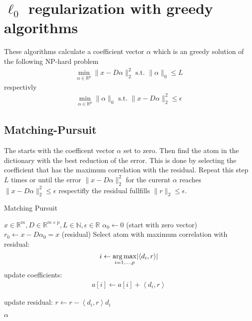 \section{$\ell_0$ regularization with greedy algorithms}

These algorithms calculate a coefficient vector $\alpha$ which is an greedy solution of the following NP-hard problem
\begin{align}
\min_{\alpha\in\mathbb{R}^{p}}  \lVert x - D\alpha \rVert^{2}_{2} \textrm{ s.t. } \lVert \alpha \rVert_{0} \leq L
\end{align}
respectivly
\begin{align}
\min_{\alpha\in\mathbb{R}^{p}}   \lVert \alpha \rVert_{0}   \textrm{ s.t. } \lVert x - D\alpha \rVert^{2}_{2} \leq \epsilon
\end{align}
\cite{Mallat1993}

\subsection{Matching-Pursuit}
\label{sec:mp}

The  starts with the coefficent vector $\alpha$ set to zero. Then find the atom in the dictionary with the best reduction of the error.
This is done by selecting the coefficient that has the maximum correlation with the residual. 
Repeat this step $L$ times or until the error $\lVert x - D\alpha \rVert^{2}_{2}$ for the curernt $\alpha$ reaches $\lVert x - D\alpha \rVert^{2}_{2} \leq \epsilon$ respectifly the residual fullfills $\lVert r \rVert_2 \leq \epsilon$.


\begin{algorithm}
\caption{Matching Pursuit}
\label{alg:mp}
\begin{algorithmic}[1]
\REQUIRE $x \in \mathbb{R}^m, D \in \mathbb{R}^{m\times p}, L \in \mathbb{N}, \epsilon \in \mathbb{R}$
\STATE $\alpha_0 \gets 0$ (start with zero vector)
\STATE $r_0 \gets x-D\alpha_0 = x$ (residual) 
\STATE Select atom with maximum correlation with residual: 
\begin{equation*}
i \gets \operatorname*{arg\,max}_{i=1,...,p} \lvert \left<d_i,r\right> \rvert
\end{equation*}
\STATE update coefficients: 
\begin{align}
a[i]  \gets a[i] + \left<d_i,r\right> \label{eq:mp_update}
\end{align}

\STATE update residual: $r \gets r - \left<d_i,r\right>d_i$

\ENDWHILE
\RETURN $\alpha$
\end{algorithmic}
\end{algorithm}

